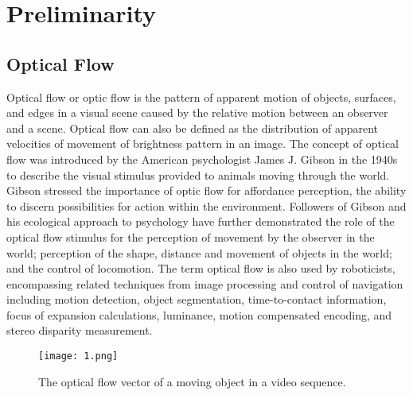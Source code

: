 \documentclass{article}
\begin{document}
\section{Preliminarity}
\subsection{Optical Flow}   
\par{Optical flow or optic flow is the pattern of apparent motion of objects, surfaces, and edges in a visual scene caused by the relative motion between an observer and a scene. Optical flow can also be defined as the distribution of apparent velocities of movement of brightness pattern in an image. The concept of optical flow was introduced by the American psychologist James J. Gibson in the 1940s to describe the visual stimulus provided to animals moving through the world. Gibson stressed the importance of optic flow for affordance perception, the ability to discern possibilities for action within the environment. Followers of Gibson and his ecological approach to psychology have further demonstrated the role of the optical flow stimulus for the perception of movement by the observer in the world; perception of the shape, distance and movement of objects in the world; and the control of locomotion. The term optical flow is also used by roboticists, encompassing related techniques from image processing and control of navigation including motion detection, object segmentation, time-to-contact information, focus of expansion calculations, luminance, motion compensated encoding, and stereo disparity measurement.}
\begin{figure}[H]
    \centering
    \texttt{[image: 1.png]}
    \caption{The optical flow vector of a moving object in a video sequence.}
    \label{simulationfigure}
\end{figure}
\end{document}
